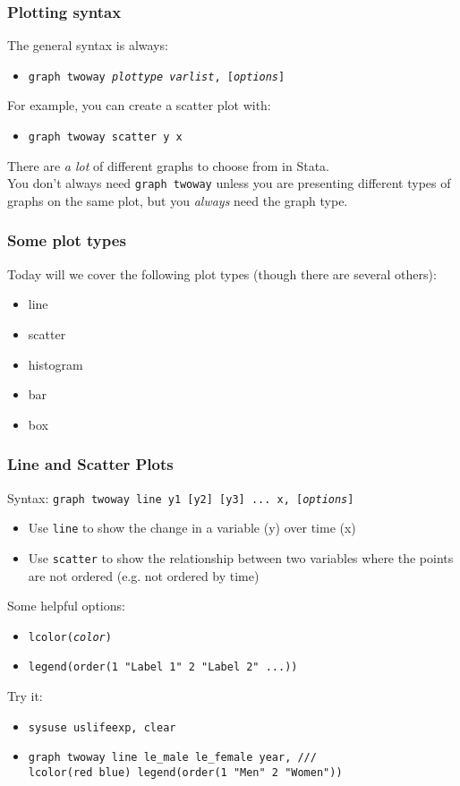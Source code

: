 \documentclass[11pt]{beamer}
\begin{document}
\begin{frame}
\frametitle{Plotting syntax}
The general syntax is always:
\begin{itemize}
        \item[] \texttt{graph twoway \textit{plottype varlist}, [\textit{options}]} 
\end{itemize} \bigskip
For example, you can create a scatter plot with:
\begin{itemize}
		\item[] \texttt{graph twoway scatter y x}
\end{itemize} \bigskip \pause
There are \textit{a lot} of different graphs to choose from in Stata. \\ \medskip
You don't always need \texttt{graph twoway} unless you are presenting different types of graphs on the same plot, but you \textit{always} need the graph type.
\end{frame}


\begin{frame}
\frametitle{Some plot types}
Today will we cover the following plot types (though there are several others):
\begin{itemize}
        \item line
        \item scatter
        \item histogram
        \item bar
        \item box
\end{itemize} 
\end{frame}

\begin{frame}
\frametitle{Line and Scatter Plots}
Syntax: \texttt{graph twoway line y1 [y2] [y3] ... x, [\textit{options}]}
\begin{itemize}
	\item Use \texttt{line} to show the change in a variable (y) over time (x)
	\item Use \texttt{scatter} to show the relationship between two variables where the points are not ordered (e.g. not ordered by time)
\end{itemize} \bigskip \pause
Some helpful options:
\begin{itemize}
	\item \texttt{lcolor(\textit{color})} 
	\item \texttt{legend(order(1 "Label 1" 2 "Label 2" ...)) }
\end{itemize} \bigskip \pause
Try it:
\begin{itemize}
	\item[] \texttt{sysuse uslifeexp, clear}
	\item[] \texttt{graph twoway line le\_male le\_female year, /// \\
		lcolor(red blue) legend(order(1 "Men" 2 "Women"))}
\end{itemize}
\end{frame}
\end{document}
